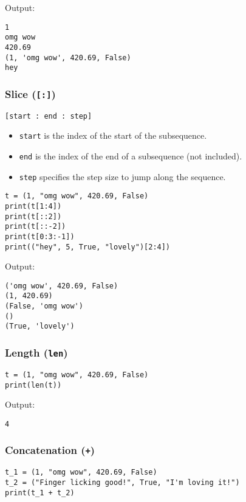 \documentclass[11pt]{article}
\begin{document}
 \noindent Output:

\label{orga03ca67}
\begin{verbatim}
1
omg wow
420.69
(1, 'omg wow', 420.69, False)
hey
\end{verbatim}


 \newpage
\subsubsection{Slice (\texttt{[:]})}
\label{sec:org423658e}
\texttt{[start : end : step]}
\begin{itemize}
\item \texttt{start} is the index of the start of the subsequence.
\item \texttt{end} is the index of the end of a subsequence (not included).
\item \texttt{step} specifies the step size to jump along the sequence.
\end{itemize}

\begin{verbatim}
t = (1, "omg wow", 420.69, False)
print(t[1:4])
print(t[::2])
print(t[::-2])
print(t[0:3:-1])
print(("hey", 5, True, "lovely")[2:4])
\end{verbatim}

 \noindent Output:

\label{org6f3115d}
\begin{verbatim}
('omg wow', 420.69, False)
(1, 420.69)
(False, 'omg wow')
()
(True, 'lovely')
\end{verbatim}
\subsubsection{Length (\texttt{len})}
\label{sec:org28a0713}
\begin{verbatim}
t = (1, "omg wow", 420.69, False)
print(len(t))
\end{verbatim}

 \noindent Output:

\label{org9f2d7a3}
\begin{verbatim}
4
\end{verbatim}
\subsubsection{Concatenation (\texttt{+})}
\label{sec:org64f7984}
\begin{verbatim}
t_1 = (1, "omg wow", 420.69, False)
t_2 = ("Finger licking good!", True, "I'm loving it!")
print(t_1 + t_2)
\end{verbatim}
\end{document}
